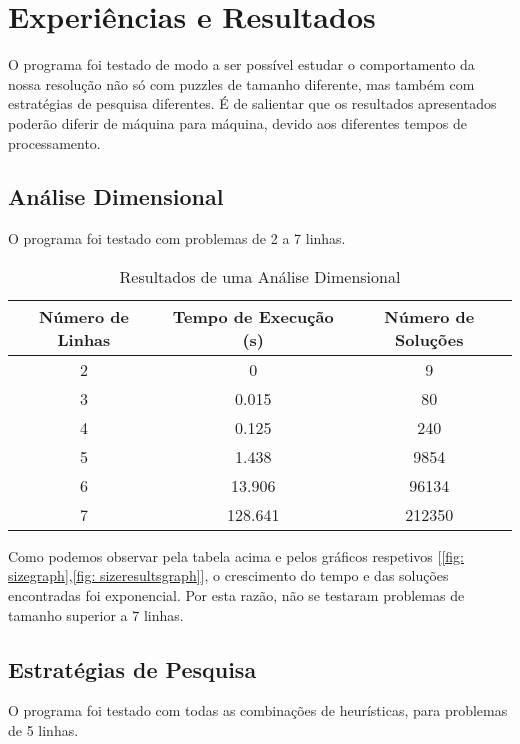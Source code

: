 \section{Experiências e Resultados}
O programa foi testado de modo a ser possível estudar o comportamento da nossa resolução não só com puzzles de tamanho diferente, mas também com estratégias de pesquisa diferentes.
É de salientar que os resultados apresentados poderão diferir de máquina para máquina, devido aos diferentes tempos de processamento.

\subsection{Análise Dimensional}
O programa foi testado com problemas de 2 a 7 linhas.

\begin{table}[h!]
\centering
\begin{tabular}{|c|c|c|} 
 \hline
 Número de Linhas & Tempo de Execução (s) & Número de Soluções \\ [0.5ex] 
 \hline
 2 & 0 & 9  \\
 3 & 0.015 & 80 \\
 4 & 0.125 & 240 \\
 5 & 1.438 & 9854 \\
 6 & 13.906 & 96134 \\
 7 & 128.641 & 212350 \\ [1ex] 
 \hline
\end{tabular}
\caption{Resultados de uma Análise Dimensional}
\label{table: dimensional_analisys}
\end{table}

Como podemos observar pela tabela acima e pelos gráficos respetivos [\ref{fig: sizegraph},\ref{fig: sizeresultsgraph}], o crescimento do tempo e das soluções encontradas foi exponencial. Por esta razão, não se testaram problemas de tamanho superior a 7 linhas.

\subsection{Estratégias de Pesquisa}
O programa foi testado com todas as combinações de heurísticas, para problemas de 5 linhas.

